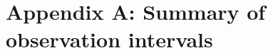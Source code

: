 

\chapter{Appendix A: Summary of observation intervals}\label{appendix:observation-periods}
\renewcommand{\thechapter}{A}
\setcounter{table}{0} 

\begin{landscape}
\begin{spacing}{.5}
    
    \label{tab:msh-observations}
\end{spacing}
\end{landscape}

\begin{landscape}
\begin{spacing}{.5}
    
    \label{tab:sw-observations}
\end{spacing}
\end{landscape}